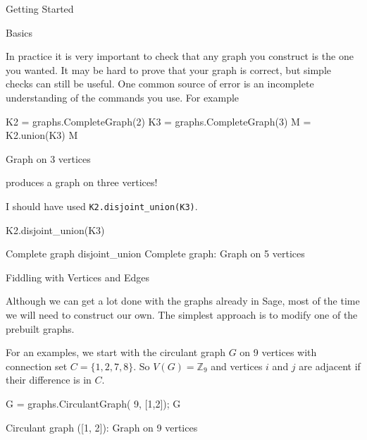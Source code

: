 \begin{chap}{Getting Started}
\begin{sect}{Basics}
\begin{para}
In practice it is very important to check that any graph you construct is
the one you wanted.  It may be hard to prove that your graph is correct,
but simple checks can still be useful. One common source of error is an incomplete
understanding of the commands you use.  For example
\end{para}
%
\begin{sagecode}
\begin{sageinput}
K2 = graphs.CompleteGraph(2)
K3 = graphs.CompleteGraph(3)
M = K2.union(K3)
M
\end{sageinput}
\begin{sageoutput}
Graph on 3 vertices
\end{sageoutput}
\end{sagecode}
%
\begin{para}
produces a graph on three vertices!
\end{para}
%
\begin{para}
I should have used \verb|K2.disjoint_union(K3)|.
\end{para}
%
\begin{sagecode}
\begin{sageinput}
K2.disjoint_union(K3)
\end{sageinput}
\begin{sageoutput}
Complete graph disjoint_union Complete graph: Graph on 5 vertices
\end{sageoutput}
\end{sagecode}
%
\end{sect}
%
\begin{sect}{Fiddling with Vertices and Edges}
%
\begin{para}
Although we can get a lot done with the graphs already in Sage, most of the time
we will need to construct our own. The simplest approach is to modify one of 
the prebuilt graphs.
\end{para}
%
\begin{para}
For an examples, we start with the circulant graph $G$ on 9 vertices
with connection set $C=\{1,2,7,8\}$. So $V(G)=\mathbb{Z}_9$ and
vertices $i$ and $j$ are adjacent if their difference is in $C$.
\end{para}
%
\begin{sagecode}
\begin{sageinput}
G = graphs.CirculantGraph( 9, [1,2]); G
\end{sageinput}
\begin{sageoutput}
Circulant graph ([1, 2]): Graph on 9 vertices
\end{sageoutput}

\end{sagecode}
\end{sect}
\end{chap}
